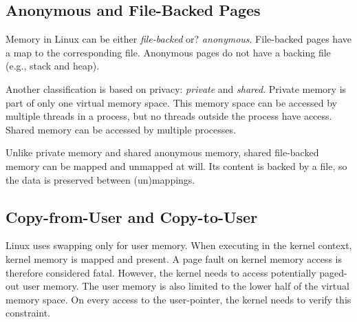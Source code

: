 \subsection{Anonymous and File-Backed Pages}
\label{subsec:anofilepages}

Memory in Linux can be either \emph{file-backed} or? \emph{anonymous}.
File-backed pages have a map to the corresponding file. Anonymous pages do not
have a backing file (e.g., stack and heap).

Another classification is based on privacy: \emph{private} and \emph{shared}. 
Private memory is part of only one virtual memory space. This memory space can 
be accessed by multiple threads in a process, but no threads outside the process
have access. Shared memory can be accessed by multiple processes.

Unlike private memory and shared anonymous memory, shared file-backed memory can
be mapped and unmapped at will. Its content is backed by a file, so the data is 
preserved between (un)mappings.




\subsection{Copy-from-User and Copy-to-User}
\label{subsec:copy}
Linux uses swapping only for user memory. When executing in the kernel context,
kernel memory is mapped and present. A page fault on kernel memory access is
therefore considered fatal. However, the kernel needs to access potentially
paged-out user memory. The user memory is also limited to the lower half of the
virtual memory space. On every access to the user-pointer, the kernel needs to
verify this constraint.

